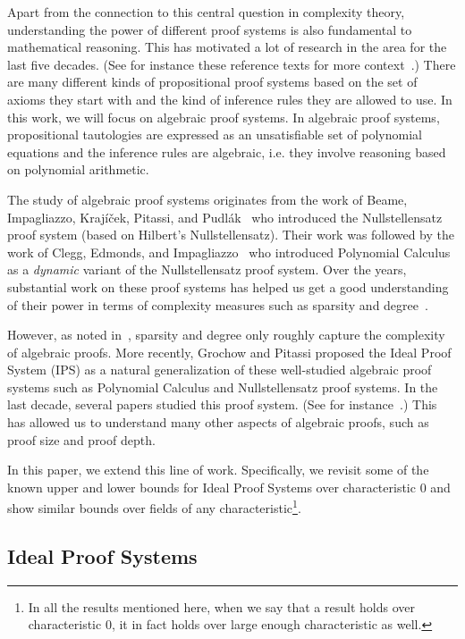 \documentclass[11pt]{article}
\begin{document}
Apart from the connection to this central question in complexity theory, understanding the power of different proof systems is also fundamental to mathematical reasoning. This has motivated a lot of research in the area for the last five decades. (See for instance these reference texts for more context~\cite{krabook95,CloteKSurvey02,krabook2019}.) There are many different kinds of propositional proof systems based on the set of axioms they start with and the kind of inference rules they are allowed to use. In this work, we will focus on algebraic proof systems. In algebraic proof systems, propositional tautologies are expressed as an unsatisfiable set of polynomial equations and the inference rules are algebraic, i.e. they involve reasoning based on polynomial arithmetic.

The study of algebraic proof systems originates from the work of Beame, Impagliazzo, Kraj\'{i}\v{c}ek, Pitassi, and Pudl\'{a}k~\cite{BIKPP94}  who introduced the Nullstellensatz proof system (based on Hilbert's Nullstellensatz). Their work was followed by the work of Clegg, Edmonds, and Impagliazzo~\cite{CEI96} who introduced Polynomial Calculus as a \emph{dynamic} variant of the Nullstellensatz proof system. Over the years, substantial work on these proof systems has helped us get a good understanding of their power in terms of complexity measures such as sparsity and degree~\cite{BIKPP94,BIPRS97,Razborov98,Grigoriev98,IPS99,BGIP01,AR2001}. 

However, as noted in~\cite{FSTW21}, sparsity and degree only roughly capture the complexity of algebraic proofs. More recently, Grochow and Pitassi \cite{GP14} proposed the Ideal Proof System (IPS) as a natural generalization of these well-studied algebraic proof systems such as Polynomial Calculus and Nullstellensatz proof systems. In the last decade, several papers studied this proof system. (See for instance~\cite{GP14,PitassiTzameretSurvey,FSTW21,GHT,HLT24}.) This has allowed us to understand many other aspects of algebraic proofs, such as proof size and proof depth. 

In this paper, we extend this line of work. Specifically, we revisit some of the known upper and lower bounds for Ideal Proof Systems over characteristic $0$ and show similar bounds over fields of any characteristic\footnote{In all the results mentioned here, when we say that a result holds over characteristic $0$, it in fact holds over large enough characteristic as well.}. 



\subsection{Ideal Proof Systems}
\label{sec:intro-ips}
\end{document}
